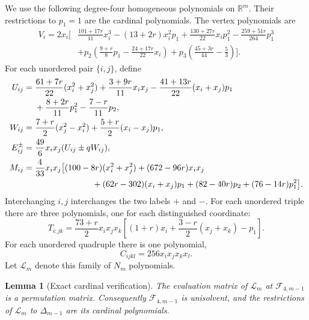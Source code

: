\documentclass[11pt,a4paper]{article}
\newcommand{\R}{\mathbb R}
\newtheorem{lemma}[theorem]{Lemma}
\theoremstyle{definition}
\theoremstyle{remark}
\numberwithin{equation}{section}
\begin{document}
We use the following degree-four homogeneous polynomials on $\R^m$.
Their restrictions to $p_1=1$ are the cardinal polynomials.  The vertex
polynomials are
\begin{equation}\label{eq:simplex-vertex}
\begin{split}
 V_i=2x_i\bigg[&\frac{101+17r}{11}x_i^3-(13+2r)x_i^2p_1
      +\frac{130+27r}{22}x_ip_1^2-\frac{259+51r}{264}p_1^3\\
 &+p_2\left(\frac{9+r}{8}p_1-\frac{24+17r}{22}x_i\right)
      +p_3\left(\frac{45+3r}{44}-\frac53\right)\bigg].
\end{split}
\end{equation}
For each unordered pair $\{i,j\}$, define
\begin{align}
 U_{ij}={}&\frac{61+7r}{22}(x_i^2+x_j^2)
       +\frac{3+9r}{11}x_ix_j
       -\frac{41+13r}{22}(x_i+x_j)p_1 \notag\\
       &+\frac{8+2r}{11}p_1^2-\frac{7-r}{11}p_2,
       \label{eq:simplex-U}\\
 W_{ij}={}&\frac{7+r}{2}(x_j^2-x_i^2)
       +\frac{5+r}{2}(x_i-x_j)p_1,\label{eq:simplex-W}\\
 E_{ij}^{\pm}={}&\frac{49}{6}x_ix_j(U_{ij}\pm qW_{ij}),
       \label{eq:simplex-edge}\\
 M_{ij}={}&\frac4{33}x_ix_j\big[(100-8r)(x_i^2+x_j^2)
       +(672-96r)x_ix_j \notag\\
       &\hspace{24mm}+(62r-302)(x_i+x_j)p_1
       +(82-40r)p_2+(76-14r)p_1^2\big].
       \label{eq:simplex-midpoint}
\end{align}
Interchanging $i,j$ interchanges the two labels $+$ and $-$.  For each
unordered triple there are three polynomials, one for each distinguished
coordinate:
\begin{equation}\label{eq:simplex-triple}
 T_{i;jk}=\frac{73+r}{2}x_ix_jx_k
 \left[(1+r)x_i+\frac{3-r}{2}(x_j+x_k)-p_1\right].
\end{equation}
For each unordered quadruple there is one polynomial,
\begin{equation}\label{eq:simplex-quadruple}
 C_{ijkl}=256x_ix_jx_kx_l.
\end{equation}
Let $\mathcal L_m$ denote this family of $N_m$ polynomials.

\begin{lemma}[Exact cardinal verification]\label{lem:simplex-cardinal}
The evaluation matrix of $\mathcal L_m$ at
$\mathcal F_{4,m-1}$ is a permutation matrix.  Consequently
$\mathcal F_{4,m-1}$ is unisolvent, and the restrictions of
$\mathcal L_m$ to $\Delta_{m-1}$ are its cardinal polynomials.
\end{lemma}
\end{document}
